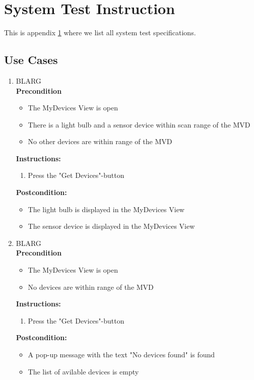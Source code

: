\documentclass[a4paper]{article}
\newlength{\testlabellength}
\newenvironment{testlist}{\begin{enumerate}[label=\bfseries Instruction \thesubsection.\arabic* , labelindent=0pt, labelwidth=\testlabellength , leftmargin=2cm]}{\end{enumerate}}
\newenvironment{precondition}{
{\color{white}BLARG}\\ 
\textbf{Precondition}
\begin{itemize}[labelindent=0cm, labelwidth=2cm , leftmargin=1cm]
}
{\end{itemize}}
\newenvironment{instruction}{
\textbf{Instructions:}
\begin{enumerate}[label=\bfseries  \arabic*., labelindent=0cm, labelwidth=2cm , leftmargin=1cm]
}
{\end{enumerate}}
\newenvironment{postcondition}{
\textbf{Postcondition:}
\begin{itemize}[labelindent=0cm, labelwidth=2cm , leftmargin=1cm]
}
{\end{itemize}}
\begin{document}
\begin{appendices}
\begin{testlist}
\end{testlist}	

\newpage

\section{System Test Instruction} \label{appendix:section:systemtest}
This is appendix \ref{appendix:section:systemtest} where we list all system test specifications.

\subsection{Use Cases}
\begin{testlist}
	\item 
		\begin{precondition}
			\item The MyDevices View is open
			\item There is a light bulb and a sensor device within scan range of the MVD
			\item No other devices are within range of the MVD
		\end{precondition}
		\begin{instruction}
			\item Press the "Get Devices"-button
		\end{instruction}
		\begin{postcondition}
			\item The light bulb is displayed in the MyDevices View
		 	\item The sensor device is displayed in the MyDevices View
		\end{postcondition}

	\item 
		\begin{precondition}
			\item The MyDevices View is open
			\item No devices are within range of the MVD
		\end{precondition}
		\begin{instruction}
			\item Press the "Get Devices"-button
		\end{instruction}
		\begin{postcondition}
			\item A pop-up message with the text "No devices found" is found
			\item The list of avilable devices is empty
		\end{postcondition}
	

\end{testlist}
\end{appendices}
\end{document}
